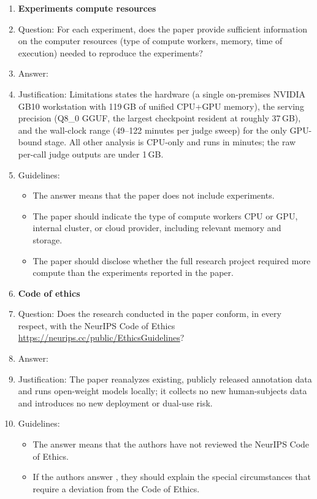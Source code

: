 \documentclass{article}
\begin{document}
\begin{enumerate}
\item {\bf Experiments compute resources}
    \item[] Question: For each experiment, does the paper provide sufficient information on the computer resources (type of compute workers, memory, time of execution) needed to reproduce the experiments?
    \item[] Answer: \answerYes{}
    \item[] Justification: Limitations states the hardware (a single on-premises NVIDIA GB10 workstation with 119\,GB of unified CPU+GPU memory), the serving precision (Q8\_0 GGUF, the largest checkpoint resident at roughly 37\,GB), and the wall-clock range (49--122 minutes per judge sweep) for the only GPU-bound stage. All other analysis is CPU-only and runs in minutes; the raw per-call judge outputs are under 1\,GB.
    \item[] Guidelines:
    \begin{itemize}
        \item The answer \answerNA{} means that the paper does not include experiments.
        \item The paper should indicate the type of compute workers CPU or GPU, internal cluster, or cloud provider, including relevant memory and storage.
        \item The paper should disclose whether the full research project required more compute than the experiments reported in the paper.
    \end{itemize}

\item {\bf Code of ethics}
    \item[] Question: Does the research conducted in the paper conform, in every respect, with the NeurIPS Code of Ethics \url{https://neurips.cc/public/EthicsGuidelines}?
    \item[] Answer: \answerYes{}
    \item[] Justification: The paper reanalyzes existing, publicly released annotation data and runs open-weight models locally; it collects no new human-subjects data and introduces no new deployment or dual-use risk.
    \item[] Guidelines:
    \begin{itemize}
        \item The answer \answerNA{} means that the authors have not reviewed the NeurIPS Code of Ethics.
        \item If the authors answer \answerNo, they should explain the special circumstances that require a deviation from the Code of Ethics.
    \end{itemize}


\end{enumerate}
\end{document}
